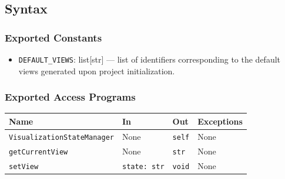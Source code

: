 \documentclass[12pt, titlepage]{article}
\begin{document}
\subsection{Syntax}

\subsubsection{Exported Constants}
\begin{itemize}
  \item \texttt{DEFAULT\_VIEWS}: list[str] — list of identifiers corresponding to the default views generated upon project initialization.
\end{itemize}

\subsubsection{Exported Access Programs}
\begin{center}
\renewcommand{\arraystretch}{1.55}
\begin{tabular}{p{5.5cm} p{3cm} p{3cm} p{2.5cm}}
\hline
\textbf{Name} & \textbf{In} & \textbf{Out} & \textbf{Exceptions} \\ \hline
\texttt{VisualizationStateManager} & None & \texttt{self} & None \\
\texttt{getCurrentView} & None & \texttt{str} & None \\
\texttt{setView} & \texttt{state: str} & \texttt{void} & None \\
\hline
\end{tabular}
\end{center}
\end{document}
